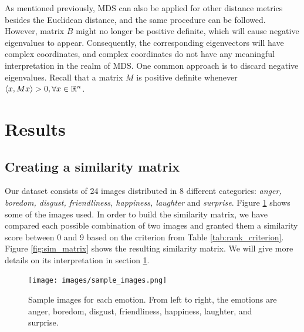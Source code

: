 \documentclass[11pt, a4paper]{article}
\numberwithin{equation}{subsection}
\begin{document}
As mentioned previously, MDS can also be applied for other distance metrics besides the Euclidean distance, and the same procedure can be followed. However, matrix $B$ might no longer be positive definite, which will cause negative eigenvalues to appear. Consequently, the corresponding eigenvectors will have complex coordinates, and complex coordinates do not have any meaningful interpretation in the realm of MDS. One common approach is to discard negative eigenvalues. Recall that a matrix $M$ is positive definite whenever $\langle x, Mx \rangle > 0, \space \forall x \in \mathbb{R}^n$.


\section{Results}\label{analysis}

\subsection{Creating a similarity matrix}\label{sim_matrix_section}

Our dataset consists of 24 images distributed in 8 different categories: \textit{anger, boredom, disgust, friendliness, happiness, laughter} and \textit{surprise}. Figure \ref{fig:sample_images} shows some of the images used. In order to build the similarity matrix, we have compared each possible combination of two images and granted them a similarity score between 0 and 9 based on the criterion from Table \ref{tab:rank_criterion}. Figure \ref{fig:sim_matrix} shows the resulting similarity matrix. We will give more details on its interpretation in section \ref{analysis}.

\begin{figure}[h]
    \centering
    \vspace{0in}
    \texttt{[image: images/sample\_images.png]}
    \caption{Sample images for each emotion. From left to right, the emotions are anger, boredom, disgust, friendliness, happiness, laughter, and surprise.}
    \label{fig:sample_images}
\end{figure}
\end{document}
